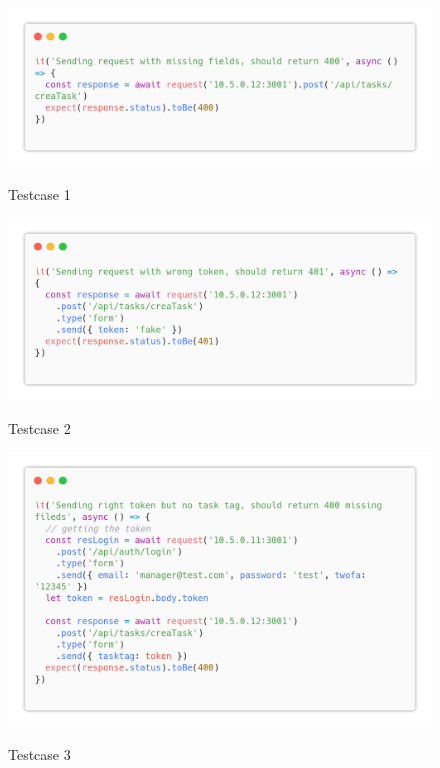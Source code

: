 \documentclass{report}
\begin{document}
\begin{figure}[H]
	\centering\includegraphics[width=1\textwidth]{images/code_crea_task_test1.png}

	Testcase 1
\end{figure}
\begin{figure}[H]
	\centering\includegraphics[width=1\textwidth]{images/code_crea_task_test2.png}

	Testcase 2
\end{figure}
\begin{figure}[H]
	\centering\includegraphics[width=1\textwidth]{images/code_crea_task_test3.png}

	Testcase 3
\end{figure}
\end{document}
